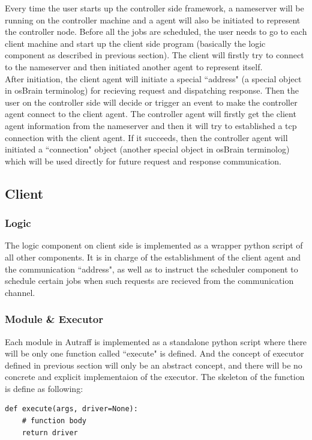 \documentclass[12pt]{report}
\begin{document}
Every time the user starts up the controller side framework, a nameserver will be running on the controller machine and a agent will also be initiated to represent the controller node. Before all the jobs are scheduled, the user needs to go to each client machine and start up the client side program (basically the logic component as described in previous section). The client will firstly try to connect to the nameserver and then initiated another agent to represent itself.\\

After initiation, the client agent will initiate a special ``address" (a special object in osBrain terminolog) for recieving request and dispatching response. Then the user on the controller side will decide or trigger an event to make the controller agent connect to the client agent. The controller agent will firstly get the client agent information from the nameserver and then it will try to established a tcp connection with the client agent. If it succeeds, then the controller agent will initiated a ``connection" object (another special object in osBrain terminolog) which will be used directly for future request and response communication.


\subsection{Client}
\subsubsection{Logic}
The logic component on client side is implemented as a wrapper python script of all other components. It is in charge of the establishment of the client agent and the communication ``address", as well as to instruct the scheduler component to schedule certain jobs when such requests are recieved from the communication channel.

\subsubsection{Module \& Executor}
Each module in Autraff is implemented as a standalone python script where there will be only one function called ``execute" is defined. And the concept of executor defined in previous section will only be an abstract concept, and there will be no concrete and explicit implementaion of the executor. The skeleton of the function is define as following:

\begin{lstlisting}
def execute(args, driver=None):
    # function body
    return driver
\end{lstlisting}
\end{document}
